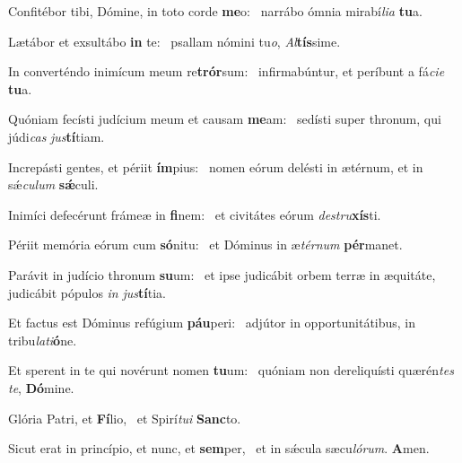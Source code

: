 \item Confitébor tibi, Dómine, in toto corde \textbf{me}o:~\psstar{} narrábo ómnia mirabí\textit{lia} \textbf{tu}a.
\item Lætábor et exsultábo \textbf{in} te:~\psstar{} psallam nómini tu\textit{o}, \textit{Al}\textbf{tís}sime.
\item In converténdo inimícum meum re\textbf{trór}sum:~\psstar{} infirmabúntur, et períbunt a fá\textit{cie} \textbf{tu}a.
\item Quóniam fecísti judícium meum et causam \textbf{me}am:~\psstar{} sedísti super thronum, qui júdi\textit{cas} \textit{jus}\textbf{tí}tiam.
\item Increpásti gentes, et périit \textbf{ím}pius:~\psstar{} nomen eórum delésti in ætérnum, et in sǽ\textit{culum} \textbf{sǽ}culi.
\item Inimíci defecérunt frámeæ in \textbf{fi}nem:~\psstar{} et civitátes eórum \textit{destru}\textbf{xís}ti.
\item Périit memória eórum cum \textbf{só}nitu:~\psstar{} et Dóminus in æ\textit{térnum} \textbf{pér}manet.
\item Parávit in judício thronum \textbf{su}um:~\psstar{} et ipse judicábit orbem terræ in æquitáte, judicábit pópulos \textit{in} \textit{jus}\textbf{tí}tia.
\item Et factus est Dóminus refúgium \textbf{páu}peri:~\psstar{} adjútor in opportunitátibus, in tribu\textit{lati}\textbf{ó}ne.
\item Et sperent in te qui novérunt nomen \textbf{tu}um:~\psstar{} quóniam non dereliquísti quærén\textit{tes} \textit{te}, \textbf{Dó}mine.
\item Glória Patri, et \textbf{Fí}lio,~\psstar{} et Spirí\textit{tui} \textbf{Sanc}to.
\item Sicut erat in princípio, et nunc, et \textbf{sem}per,~\psstar{} et in sǽcula sæcu\textit{lórum}. \textbf{A}men.

